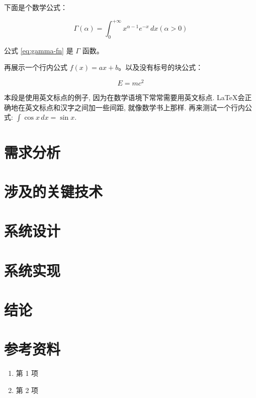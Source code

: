 \documentclass[a4paper, 11pt]{ctexart}
\begin{document}
下面是个数学公式：

\begin{equation}
    \Gamma(\alpha) = \int_{0}^{+\infty} x^{\alpha - 1} e^{-x} \,dx (\alpha > 0)
    \label{eq:gamma-fn}
\end{equation}

公式 \ref{eq:gamma-fn} 是 $\Gamma$ 函数。

再展示一个行内公式 $f(x) = ax + b$。以及没有标号的块公式：

$$
E = mc^2
$$

本段是使用英文标点的例子, 因为在数学语境下常常需要用英文标点. \LaTeX 会正确地在英文标点和汉字之间加一些间距, 就像数学书上那样. 再来测试一个行内公式: $\int \cos x \,dx = \sin x$.

\clearpage
\section{需求分析}

\clearpage
\section{涉及的关键技术}

\clearpage
\section{系统设计}

\clearpage
\section{系统实现}

\clearpage
\section{结论}

\clearpage
\section{参考资料}

\begin{enumerate}
    \item 第 1 项
    \item 第 2 项
\end{enumerate}
\end{document}
